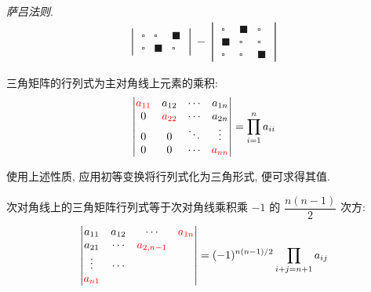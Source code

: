 \documentclass[UTF8]{ctexart}
\theoremstyle{remark}
\newenvironment{concept}[1]
{\hspace{1em} #1. \hspace{0.5em}}
{\vspace{0.5em}}
\begin{document}
\begin{framed}
\begin{concept}{\textit{萨吕法则}}
\begin{align*}
\begin{vmatrix}
                \square & \square & \blacksquare \\
                \square & \blacksquare & \square
            \end{vmatrix} -
            \begin{vmatrix} 
                \square & \blacksquare & \square \\
                \blacksquare & \square & \square \\
                \square & \square & \blacksquare
            \end{vmatrix}
        \end{align*}     
    \end{concept}
    
\end{framed}

三角矩阵的行列式为主对角线上元素的乘积:
\[ 
\begin{vmatrix}
    {\color{red} a_{11}} & a_{12} & \cdots & a_{1n} \\
    0 & {\color{red} a_{22}} & \cdots & a_{2n} \\
    0 & 0 & \ddots & \vdots \\
    0 & 0 & \cdots & {\color{red} a_{nn}} \\
\end{vmatrix} = \prod_{i = 1}^n a_{ii}   
\]

使用上述性质, 应用初等变换将行列式化为三角形式, 便可求得其值.

次对角线上的三角矩阵行列式等于次对角线乘积乘 $ -1 $ 的 $ \dfrac{n(n-1)}{2} $ 次方:
\[
\begin{vmatrix}
    a_{11} & a_{12} & \cdots & {\color{red} a_{1n}} \\
    a_{21} & \cdots & {\color{red} a_{2, n-1}} &  \\
    \vdots & \cdots &  &  \\
    {\color{red} a_{n1}} &  &  &  \\
\end{vmatrix} = (-1)^{ n(n-1)/2}\prod_{i + j = n + 1} a_{ij}   
\]
\end{document}
